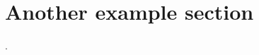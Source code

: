 \section{Another example section}

\cite{bach_2024_learning, lindholm_2022_smlbook, sutton_2018_irl}.
